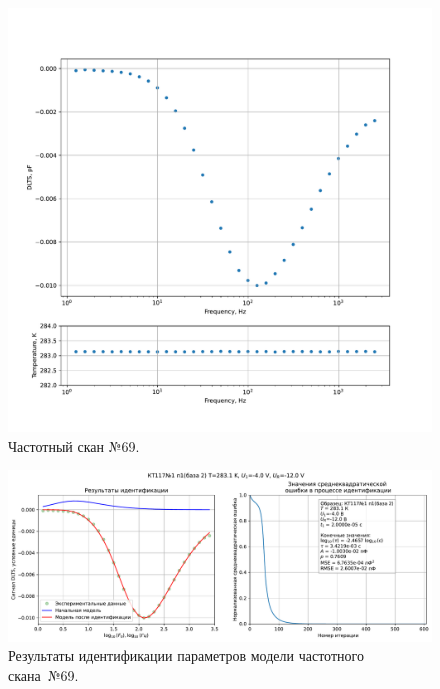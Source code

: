 \begin{figure}[!ht]
    \centering
    \includegraphics[width=1\textwidth]{../plots/КТ117№1_п1(база 2)_2500Гц-1Гц_1пФ_+10С_-4В-12В_200мВ_20мкс_шаг_0,1.pdf}
    \caption{Частотный скан №69.}
    \label{pic:frequency_scan_69}
\end{figure}

\begin{figure}[!ht]
    \centering
    \includegraphics[width=1\textwidth]{../plots/КТ117№1_п1(база 2)_2500Гц-1Гц_1пФ_+10С_-4В-12В_200мВ_20мкс_шаг_0,1_model.pdf}
    \caption{Результаты идентификации параметров модели частотного скана~№69.}
    \label{pic:frequency_scan_model69}
\end{figure}

\pagebreak


